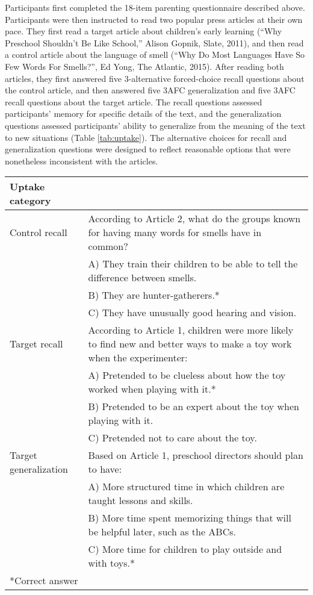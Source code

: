 \documentclass[10pt, letterpaper]{article}
\begin{document}
Participants first completed the 18-item parenting questionnaire
described above. Participants were then instructed to read two popular
press articles at their own pace. They first read a target article about
children's early learning (``Why Preschool Shouldn't Be Like School,''
Alison Gopnik, Slate, 2011), and then read a control article about the
language of smell (``Why Do Most Languages Have So Few Words For
Smells?'', Ed Yong, The Atlantic, 2015). After reading both articles,
they first answered five 3-alternative forced-choice recall questions
about the control article, and then answered five 3AFC generalization
and five 3AFC recall questions about the target article. The recall
questions assessed participants' memory for specific details of the
text, and the generalization questions assessed participants' ability to
generalize from the meaning of the text to new situations (Table
\ref{tab:uptake}). The alternative choices for recall and generalization
questions were designed to reflect reasonable options that were
nonetheless inconsistent with the articles.

\begin{table*}[t]
\centering
\begin{tabular}{p{1.25in}p{5.25in}}
  \hline
Uptake category \\ 
  \hline
Control recall 
& According to Article 2, what do the groups known for having many words for smells have in common? \\ 
  & A) They train their children to be able to tell the difference between smells.\\ 
  & B) They are hunter-gatherers.*\\ 
  & C) They have unusually good hearing and vision.\\ 
\hline
Target recall
  & According to Article 1, children were more likely to find new and better ways to make a toy work when the experimenter:\\ 
  & A) Pretended to be clueless about how the toy worked when playing with it.*\\ 
  & B) Pretended to be an expert about the toy when playing with it.\\ 
  & C) Pretended not to care about the toy.\\ 
  \hline
  Target generalization 
  & Based on Article 1, preschool directors should plan to have:\\ 
  & A) More structured time in which children are taught lessons and skills.\\ 
  & B) More time spent memorizing things that will be helpful later, such as the ABCs.\\
  & C) More time for children to play outside and with toys.*\\
   \hline
*Correct answer   
\end{tabular}
\caption{Examples of uptake questions.\label{tab:uptake}} 
\end{table*}
\end{document}
